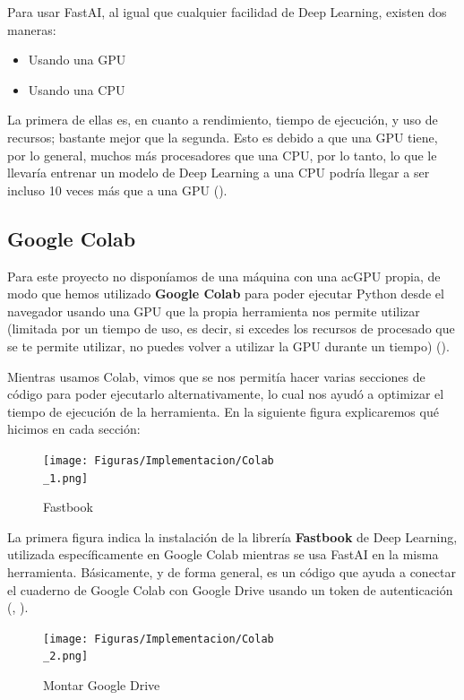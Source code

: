 Para usar FastAI, al igual que cualquier facilidad de Deep Learning, existen dos maneras:

\begin{itemize}
\item Usando una \ac{GPU}
\item Usando una \ac{CPU}
\end{itemize}

La primera de ellas es, en cuanto a rendimiento, tiempo de ejecución, y uso de recursos; bastante mejor que la segunda. Esto es debido a que una \ac{GPU} tiene, por lo general, muchos más procesadores que una \ac{CPU}, por lo tanto, lo que le llevaría entrenar un modelo de Deep Learning a una \ac{CPU} podría llegar a ser incluso 10 veces más que a una \ac{GPU} (\cite{gpu-cpu}). %

\subsection{Google Colab}

Para este proyecto no disponíamos de una máquina con una ac{GPU} propia, de modo que hemos utilizado \textbf{Google Colab} para poder ejecutar Python desde el navegador usando una \ac{GPU} que la propia herramienta nos permite utilizar (limitada por un tiempo de uso, es decir, si excedes los recursos de procesado que se te permite utilizar, no puedes volver a utilizar la \ac{GPU} durante un tiempo) (\cite{google-colab}). %

Mientras usamos Colab, vimos que se nos permitía hacer varias secciones de código para poder ejecutarlo alternativamente, lo cual nos ayudó a optimizar el tiempo de ejecución de la herramienta. En la siguiente figura explicaremos qué hicimos en cada sección:

\begin{figure}[H]
  \centering
  \texttt{[image: Figuras/Implementacion/Colab\\\_1.png]}
  \label{fig:colab-1}
  \caption{Fastbook}
\end{figure}

La primera figura indica la instalación de la librería \textbf{Fastbook} de Deep Learning, utilizada específicamente en Google Colab mientras se usa FastAI en la misma herramienta. Básicamente, y de forma general, es un código que ayuda a conectar el cuaderno de Google Colab con Google Drive usando un token de autenticación (\cite{fastbook-1}, \cite{fastbook-2}). %

\begin{figure}[H]
  \centering
  \texttt{[image: Figuras/Implementacion/Colab\\\_2.png]}
  \label{fig:colab-2}
  \caption{Montar Google Drive}
\end{figure}

